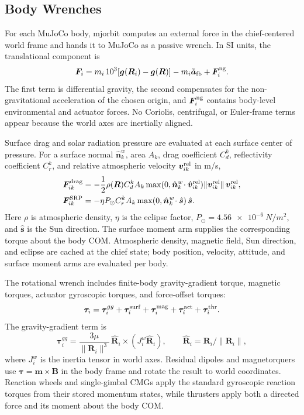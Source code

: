 \documentclass[11pt]{article}
\newcommand{\mjorbit}{mjorbit}
\newcommand{\mj}{MuJoCo}
\begin{document}
\subsection{Body Wrenches}
\label{subsec:body-wrenches}

For each \mj{} body, \mjorbit{} computes an external force in the
chief-centered world frame and hands it to \mj{} as a passive wrench. In SI
units, the translational component is
\begin{equation}
  \bm F_i =
    m_i\,10^3\!\left[\bm g(\bm R_i)-\bm g(\bm R)\right]
    -m_i\tilde{\bm a}_{\rm fb}
    +\bm F_i^{\rm ng}.
  \label{eq:body-force}
\end{equation}
The first term is differential gravity, the second compensates for the
non-gravitational acceleration of the chosen origin, and
$\bm F_i^{\rm ng}$ contains body-level environmental and actuator forces.
No Coriolis, centrifugal, or Euler-frame terms appear because the world axes
are inertially aligned.

Surface drag and solar radiation pressure are evaluated at each surface
center of pressure. For a surface normal $\hat{\bm n}_k^w$, area $A_k$,
drag coefficient $C_d^k$, reflectivity coefficient $C_r^k$, and relative
atmospheric velocity $\bm v_{ik}^{\rm rel}$ in \si{m/s},
\begin{align}
  \bm F_{ik}^{\rm drag}
   &= -\frac{1}{2}\rho(\bm R) C_d^k A_k
      \max(0,\hat{\bm n}_k^w\!\cdot\hat{\bm v}_{ik}^{\rm rel})
      \|\bm v_{ik}^{\rm rel}\|\,\bm v_{ik}^{\rm rel},\\
  \bm F_{ik}^{\rm SRP}
   &= -\eta P_\odot C_r^k A_k
      \max(0,\hat{\bm n}_k^w\!\cdot\hat{\bm s})\,\hat{\bm s}.
  \label{eq:surface-forces}
\end{align}
Here $\rho$ is atmospheric density, $\eta$ is the eclipse factor,
$P_\odot=\SI{4.56e-6}{N/m^2}$, and $\hat{\bm s}$ is the Sun direction.
The surface moment arm supplies the corresponding torque about the body COM.
Atmospheric density, magnetic field, Sun direction, and eclipse are cached at
the chief state; body position, velocity, attitude, and surface moment arms
are evaluated per body.

The rotational wrench includes finite-body gravity-gradient torque,
magnetic torques, actuator gyroscopic torques, and force-offset torques:
\begin{equation}
  \bm\tau_i =
  \bm\tau_i^{gg}
  + \bm\tau_i^{\rm surf}
  + \bm\tau_i^{\rm mag}
  + \bm\tau_i^{\rm act}
  + \bm\tau_i^{\rm thr}.
  \label{eq:body-torque-sum}
\end{equation}
The gravity-gradient term is
\begin{equation}
  \bm\tau_i^{gg}
    = \frac{3\mu}{\|\bm R_i\|^3}\,
      \hat{\bm R}_i \times \left(J_i^w\hat{\bm R}_i\right),
  \qquad \hat{\bm R}_i=\bm R_i/\|\bm R_i\|,
  \label{eq:gg-torque}
\end{equation}
where $J_i^w$ is the inertia tensor in world axes. Residual dipoles and
magnetorquers use $\bm\tau=\bm m\times\bm B$ in the body frame and rotate the
result to world coordinates. Reaction wheels and single-gimbal CMGs apply the
standard gyroscopic reaction torques from their stored momentum states, while
thrusters apply both a directed force and its moment about the body COM.
\end{document}
